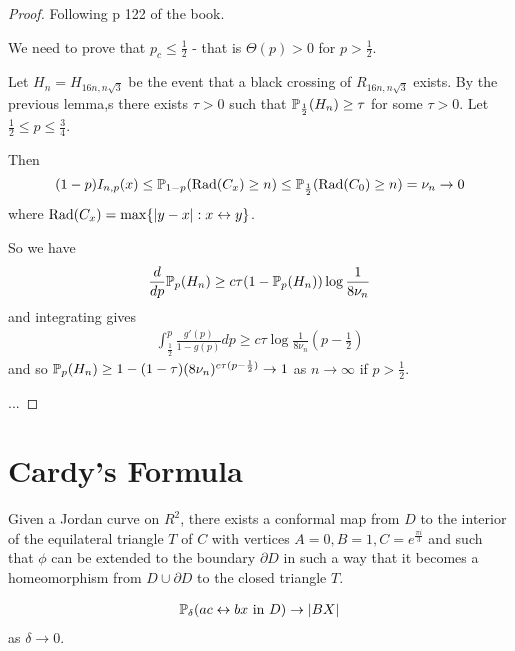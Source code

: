 \begin{proof}
  Following p 122 of the book.
  
  We need to prove that $p_{c} \leq \frac{1}{2}$ - that is $\Theta(p)
  > 0$ for $p > \frac{1}{2}$.


  Let $H_{n} = H_{16 n, n \sqrt{3}}$ be the event that a black
  crossing of $R_{16n, n \sqrt{3}}$ exists. By the previous lemma,s
  there exists $\tau > 0$ such that $\Prob_{\frac{1}{2}}(H_{n}) \geq
  \tau$ for some $\tau > 0$. Let $\frac{1}{2} \leq p \leq
  \frac{3}{4}$.

  Then
  \begin{equation}
    \label{eq:43}
    (1-p) I_{n, p}(x) \leq \Prob_{1-p}(\rad(C_{x}) \geq n) \leq
    \Prob_{\frac{1}{2}} (\rad(C_{0}) \geq n) = \nu_{n} \rightarrow 0
  \end{equation}
  where $\operatorname*{Rad}(C_{x}) = \max \{ |y-x| : x \leftrightarrow y \}$.

  So we have
  \begin{align}
    \label{eq:44}
    \frac{d}{dp} \Prob_{p}(H_{n}) \geq c \tau(1 - \Prob_{p}(H_{n}))
    \log \frac{1}{8 \nu_{n}}
  \end{align}
  and integrating gives
  \begin{align}
    \label{eq:45}
    \int_{\frac{1}{2}}^{p} \frac{g'(p)}{1-g(p)} dp \geq c \tau \log
    \frac{1}{8 \nu_{n}} (p - \frac{1}{2})
  \end{align}
  and so $\Prob_{p}(H_{n}) \geq 1 - (1-\tau)(8 \nu_{n})^{c \tau(p -
    \frac{1}{2})} \rightarrow 1$ as $n \rightarrow \infty$ if $p >
  \frac{1}{2}$.

  ... 
\end{proof}

\section{Cardy's Formula}
\label{sec:cardys-formula}

Given a Jordan curve on $R^{2}$, there exists a conformal map from $D$
to the interior of the equilateral triangle $T$ of $C$ with vertices
$A=0, B=1, C= e^{\frac{\pi i}{3}}$ and such that $\phi$ can be
extended to the boundary $\partial D$ in such a way that it becomes a
homeomorphism from $D \cup \partial D$ to the closed triangle $T$.

\begin{thm}
  \label{defn:random_walks_on_graphs:28}
  \begin{align}
    \label{eq:46}
    \Prob_{\delta}(\text{$ac \leftrightarrow bx$ in $D$}) \rightarrow
    |BX| 
  \end{align} as $\delta \rightarrow 0$.
\end{thm}

